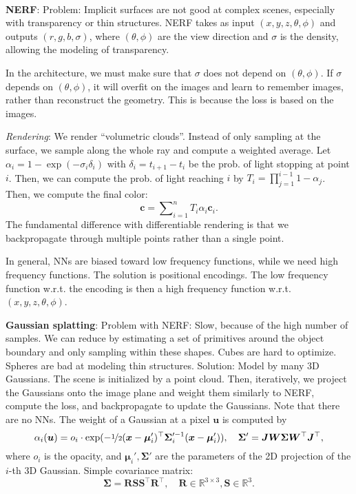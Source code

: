 \documentclass{article}
\newcommand{\R}{\mathbb{R}}
\renewcommand{\vec}[1]{\bm{#1}}
\newcommand{\mat}[1]{\bm{#1}}
\newenvironment{topic}[1]
{\textbf{\sffamily \colorbox{black}{\rlap{\textbf{\textcolor{white}{#1}}}\hspace{\linewidth}\hspace{-2\fboxsep}}} \\ \vspace{0.2cm}}
{}
\begin{document}
\begin{multicols*}{2}
\begin{topic}{Implicit surfaces and neural radiance fields}
        \textbf{NERF}: Problem: Implicit surfaces are not good at complex scenes, especially with
        transparency or thin structures. NERF takes as input $(x,y,z,\theta,\phi)$ and outputs
        $(r,g,b,\sigma)$, where $(\theta,\phi)$ are the view direction and $\sigma$ is the density,
        allowing the modeling of transparency.

        In the architecture, we must make sure that $\sigma$ does not depend on $(\theta,\phi)$. If
        $\sigma$ depends on $(\theta,\phi)$, it will overfit on the images and learn to remember images,
        rather than reconstruct the geometry. This is because the loss is based on the images.

        \textit{Rendering}: We render ``volumetric clouds''. Instead of only sampling at the surface, we sample
        along the whole ray and compute a weighted average. Let $\alpha_i = 1 - \exp(-\sigma_i \delta_i)$
        with $\delta_i = t_{i+1} - t_i$ be the prob. of light stopping at point $i$. Then, we can compute
        the prob. of light reaching $i$ by $T_i = \prod_{j=1}^{i-1} 1 - \alpha_j$. Then, we compute
        the final color: \[
            \vec{c} = \sum\nolimits_{i=1}^{n} T_i \alpha_i \vec{c}_i.
        \]
        The fundamental difference with differentiable rendering is that we backpropagate through multiple
        points rather than a single point.

        In general, NNs are biased toward low frequency functions, while we need high frequency functions.
        The solution is positional encodings. The low frequency function w.r.t. the encoding is then a high
        frequency function w.r.t. $(x,y,z,\theta,\phi)$.

        \textbf{Gaussian splatting}: Problem with NERF: Slow, because of the high number of samples.
        We can reduce by estimating a set of primitives around the object boundary and only sampling
        within these shapes. Cubes are hard to optimize. Spheres are bad at modeling thin structures.
        Solution: Model by many 3D Gaussians. The scene is initialized by a point cloud. Then,
        iteratively, we project the Gaussians onto the image plane and weight them similarly to NERF,
        compute the loss, and backpropagate to update the Gaussians. Note that there are no
        NNs. The weight of a Gaussian at a pixel $\vec{u}$ is computed by \[
            \alpha_i(\vec{u}) = o_i \cdot \exp ( -\nicefrac{1}{2} (\vec{x} - \vec{\mu}_i')^\top \mat{\Sigma}_i'^{-1} (\vec{x} - \vec{\mu}_i')), \quad \mat{\Sigma}' = \mat{J} \mat{W} \mat{\Sigma} \mat{W}^\top \mat{J}^\top,
        \]
        where $o_i$ is the opacity, and $\vec{\mu}_i', \mat{\Sigma}'$ are the parameters of the 2D
        projection of the $i$-th 3D Gaussian. Simple covariance matrix: \[
            \mat{\Sigma} = \mat{R} \mat{S} \mat{S}^\top \mat{R}^\top, \quad \mat{R} \in \R^{3\times 3}, \mat{S} \in \R^3.
        \]


\end{topic}
\end{multicols*}
\end{document}
